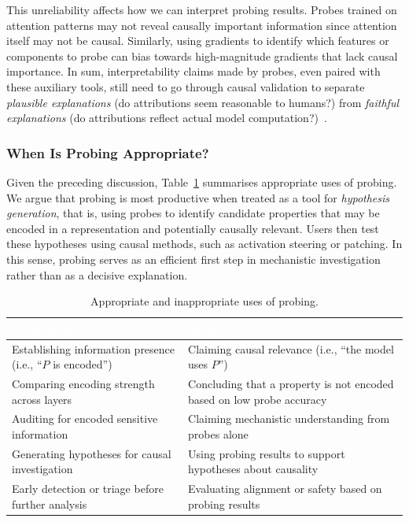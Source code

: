 This unreliability affects how we can interpret probing results. Probes trained on attention patterns may not reveal causally important information since attention itself may not be causal. Similarly, using gradients to identify which features or components to probe can bias towards high-magnitude gradients that lack causal importance. In sum, interpretability claims made by probes, even paired with these auxiliary tools, still need to go through causal validation to separate \emph{plausible explanations} (do attributions seem reasonable to humans?) from \emph{faithful explanations} (do attributions reflect actual model computation?)~.

\subsubsection{When Is Probing Appropriate?}

Given the preceding discussion, Table~\ref{tab:probing-guidance} summarises appropriate uses of probing. We argue that probing is most productive when treated as a tool for \emph{hypothesis generation}, that is, using probes to identify candidate properties that may be encoded in a representation and potentially causally relevant. Users then test these hypotheses using causal methods, such as activation steering or patching. In this sense, probing serves as an efficient first step in mechanistic investigation rather than as a decisive explanation.

\begin{table}[tb]
\centering
\caption{Appropriate and inappropriate uses of probing.}
\label{tab:probing-guidance}
\renewcommand{\arraystretch}{1.3}
\begin{tabular}{>{\raggedright\arraybackslash}p{6.5cm} >{\raggedright\arraybackslash}p{6.5cm}}
\toprule
\rowcolor{tableheader!80} \textcolor{white}{\textbf{Appropriate Uses}} & \textcolor{white}{\textbf{Inappropriate Uses}} \\
\midrule
\rowcolor{tablerow1} Establishing information presence (i.e., ``$P$ is encoded'') & Claiming causal relevance (i.e., ``the model uses $P$'') \\
\rowcolor{tablerow2} Comparing encoding strength across layers & Concluding that a property is not encoded based on low probe accuracy \\
\rowcolor{tablerow1} Auditing for encoded sensitive information & Claiming mechanistic understanding from probes alone \\
\rowcolor{tablerow2} Generating hypotheses for causal investigation & Using probing results to support hypotheses about causality \\
\rowcolor{tablerow1} Early detection or triage before further analysis & Evaluating alignment or safety based on probing results \\
\bottomrule
\end{tabular}
\end{table}

